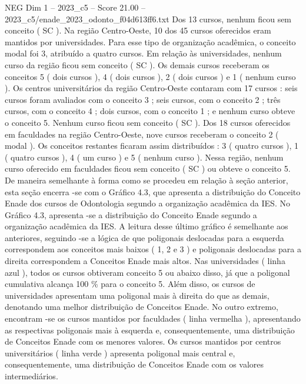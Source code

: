 \begin{textsample}{NEG Dim 1 – 2023\_c5 – Score 21.00 – 2023\_c5/enade\_2023\_odonto\_f04d613ff6.txt}
Dos 13 cursos, nenhum ficou sem conceito ( SC ).
Na região Centro-Oeste, 10 dos 45 cursos oferecidos eram mantidos por universidades.
Para esse tipo de organização acadêmica, o conceito modal foi 3, atribuído a quatro cursos.
Em relação às universidades, nenhum curso da região ficou sem conceito ( SC ).
Os demais cursos receberam os conceitos 5 ( dois cursos ), 4 ( dois cursos ), 2 ( dois cursos ) e 1 ( nenhum curso ).
Os centros universitários da região Centro-Oeste contaram com 17 cursos : seis cursos foram avaliados com o conceito 3 ; seis cursos, com o conceito 2 ; três cursos, com o conceito 4 ; dois cursos, com o conceito 1 ; e nenhum curso obteve o conceito 5.
Nenhum curso ficou sem conceito ( SC ).
Dos 18 cursos oferecidos em faculdades na região Centro-Oeste, nove cursos receberam o conceito 2 ( modal ).
Os conceitos restantes ficaram assim distribuídos : 3 ( quatro cursos ), 1 ( quatro cursos ), 4 ( um curso ) e 5 ( nenhum curso ).
Nessa região, nenhum curso oferecido em faculdades ficou sem conceito ( SC ) ou obteve o conceito 5.
De maneira semelhante à forma como se procedeu em relação à seção anterior, esta seção encerra -se com o Gráfico 4.3, que apresenta a distribuição do Conceito Enade dos cursos de Odontologia segundo a organização acadêmica da IES.
No Gráfico 4.3, apresenta -se a distribuição do Conceito Enade segundo a organização acadêmica da IES.
A leitura desse último gráfico é semelhante aos anteriores, seguindo -se a lógica de que poligonais deslocadas para a esquerda correspondem aos conceitos mais baixos ( 1, 2 e 3 ) e poligonais deslocadas para a direita correspondem a Conceitos Enade mais altos.
Nas universidades ( linha azul ), todos os cursos obtiveram conceito 5 ou abaixo disso, já que a poligonal cumulativa alcança 100 \% para o conceito 5.
Além disso, os cursos de universidades apresentam uma poligonal mais à direita do que as demais, denotando uma melhor distribuição de Conceitos Enade.
No outro extremo, encontram -se os cursos mantidos por faculdades ( linha vermelha ), apresentando as respectivas poligonais mais à esquerda e, consequentemente, uma distribuição de Conceitos Enade com os menores valores.
Os cursos mantidos por centros universitários ( linha verde ) apresenta poligonal mais central e, consequentemente, uma distribuição de Conceitos Enade com os valores intermediários.

\end{textsample}

